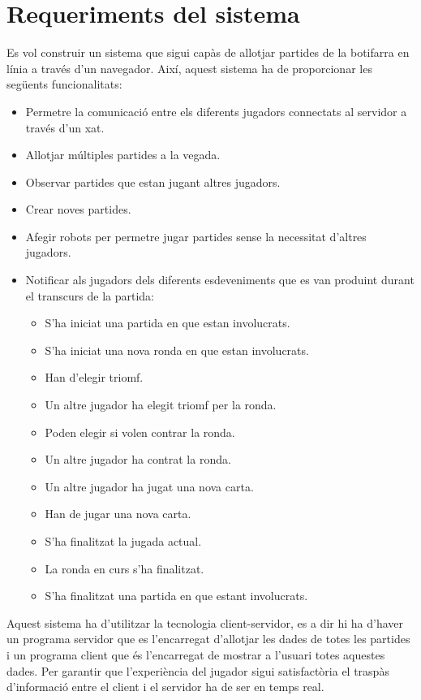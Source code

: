

\chapter{Requeriments del sistema}
\label{chap:requeriments}

Es vol construir un sistema que sigui capàs de allotjar partides de la botifarra en línia a través d'un navegador. Així, aquest sistema ha de proporcionar les següents funcionalitats: 

\begin{itemize}
\item{Permetre la comunicació entre els diferents jugadors connectats al servidor a través d'un xat.}
\item{Allotjar múltiples partides a la vegada.}
\item{Observar partides que estan jugant altres jugadors.}
\item{Crear noves partides.}
\item{Afegir robots per permetre jugar partides sense la necessitat d'altres jugadors.}
\item{
    Notificar als jugadors dels diferents esdeveniments que es van produint durant el transcurs de la partida:
    \begin{itemize}
        \item{S'ha iniciat una partida en que estan involucrats.}
        \item{S'ha iniciat una nova ronda en que estan involucrats.}
        \item{Han d'elegir triomf.}
        \item{Un altre jugador ha elegit triomf per la ronda.}
        \item{Poden elegir si volen contrar la ronda.}
        \item{Un altre jugador ha contrat la ronda.}
        \item{Un altre jugador ha jugat una nova carta.}
        \item{Han de jugar una nova carta.}
        \item{S'ha finalitzat la jugada actual.}
        \item{La ronda en curs s'ha finalitzat.}
        \item{S'ha finalitzat una partida en que estant involucrats.}
    \end{itemize}
}
\end{itemize}

Aquest sistema ha d'utilitzar la tecnologia client-servidor, es a dir hi ha d'haver un programa servidor que es l'encarregat d'allotjar les dades de totes les partides i un programa client que és l'encarregat de mostrar a l'usuari totes aquestes dades. Per garantir que l'experiència del jugador sigui satisfactòria el traspàs d'informació entre el client i el servidor ha de ser en temps real. 

